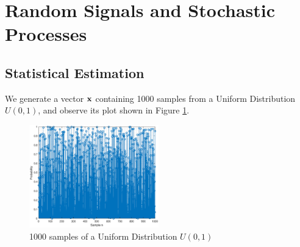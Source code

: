 


% 


\section{Random Signals and Stochastic Processes}
\vspace{0.5cm}

\subsection{Statistical Estimation}

We generate a vector $\bf x$ containing 1000 samples from a Uniform Distribution $U(0,1)$, and observe its plot shown in Figure \ref{fig:mean_norm}. 

\begin{figure}[h!]
\centering
\includegraphics[width=0.5\textwidth]{mean_norm}
\caption{\label{fig:mean_norm} 1000 samples of a Uniform Distribution $U(0,1)$}
\end{figure}

